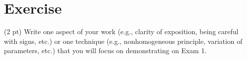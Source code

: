 %
%
\section{Exercise}

(2 pt) Write one aspect of your work (e.g., clarity of exposition, being careful with signs, etc.) or one technique (e.g., nonhomogeneous principle, variation of parameters, etc.) that you will focus on demonstrating on Exam 1.
